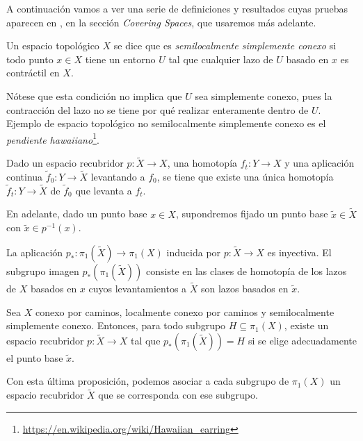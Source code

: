 \documentclass[TFG.tex]{subfiles}
\begin{document}
A continuación vamos a ver una serie de definiciones y resultados cuyas pruebas aparecen en \cite{Hatcher}, en la sección \emph{Covering Spaces}, que usaremos más adelante.

\begin{defi}
Un espacio topológico $X$ se dice que es \emph{semilocalmente simplemente conexo} si todo punto $x\in X$ tiene un entorno $U$ tal que cualquier lazo de $U$ basado en $x$ es contráctil en $X$. 
\end{defi}
Nótese que esta condición no implica que $U$ sea simplemente conexo, pues la contracción del lazo no se tiene por qué realizar enteramente dentro de $U$. Ejemplo de espacio topológico no semilocalmente simplemente conexo es el \emph{pendiente hawaiiano}\footnote{\url{https://en.wikipedia.org/wiki/Hawaiian_earring}}.

\begin{prop}
Dado un espacio recubridor $p:\widetilde{X}\to X$, una homotopía $f_t:Y\to X$ y una aplicación continua $\widetilde{f}_0:Y\to\widetilde{X}$ levantando a $f_0$, se tiene que existe una única homotopía $\widetilde{f}_t:Y\to\widetilde{X}$ de $\widetilde{f}_0$ que levanta a $f_t$.
\end{prop}

En adelante, dado un punto base $x\in X$, supondremos fijado un punto base $\widetilde{x}\in\widetilde{X}$ con $\widetilde{x}\in p^{-1}(x)$.

\begin{prop}\label{inyect}
La aplicación $p_*:\pi_1(\widetilde{X})\to\pi_1(X)$ inducida por $p:\widetilde{X}\to X$ es inyectiva. El subgrupo imagen $p_*(\pi_1(\widetilde{X}))$ consiste en las clases de homotopía de los lazos de $X$ basados en $x$ cuyos levantamientos a $\widetilde{X}$ son lazos basados en $\widetilde{x}$.
\end{prop}


\begin{prop}
Sea $X$ conexo por caminos, localmente conexo por caminos y semilocalmente simplemente conexo. Entonces, para todo subgrupo $H\subseteq \pi_1(X)$, existe un espacio recubridor $p:\widetilde{X}\to X$ tal que $p_*(\pi_1(\widetilde{X}))=H$ si se elige adecuadamente el punto base $\widetilde{x}$. 
\end{prop}

Con esta última proposición, podemos asociar a cada subgrupo de $\pi_1(X)$ un espacio recubridor $\widetilde{X}$ que se corresponda con ese subgrupo.

\end{document}
